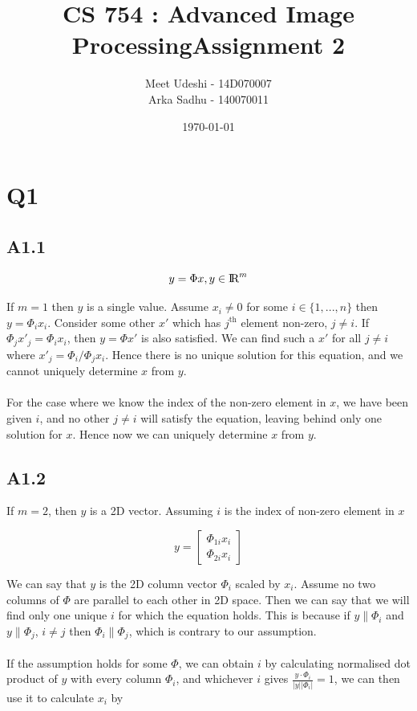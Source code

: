 \documentclass{article}
\title{CS 754 : Advanced Image ProcessingAssignment 2}
\author{Meet Udeshi - 14D070007\\
  Arka Sadhu - 140070011\\
}
\date{\today}
\begin{document}
\maketitle

\section*{Q1}
\subsection*{A1.1}

$$ y = \Phi x, y\in \text{I\!R}^{m}$$

If $m=1$ then $y$ is a single value. Assume $x_i\neq 0$ for some $i \in \{1,...,n\}$
then $y = \Phi_i x_i$.
Consider some other $x'$ which has $j^{\text{th}}$ element non-zero, $j\neq i$.
If $\Phi_j x'_j = \Phi_i x_i$, then $y=\Phi x'$ is also satisfied. We can find
such a $x'$ for all $j\neq i$ where $x'_j = \Phi_i/\Phi_j x_i$.
Hence there is no unique solution for this equation, and we cannot uniquely determine $x$ from
$y$.
\\
\\
For the case where we know the index of the non-zero element in $x$, we have been given
$i$, and no other $j\neq i$ will satisfy the equation, leaving behind only one solution for $x$. Hence now we can uniquely determine $x$ from $y$.

\subsection*{A1.2}

If $m=2$, then $y$ is a 2D vector. Assuming $i$ is the index of non-zero element in
$x$

$$ y = \left[ 
  \begin{array}{c}
    \Phi_{1i}x_i\\
    \Phi_{2i}x_i
  \end{array} 
\right] 
$$

We can say that $y$ is the 2D column vector $\Phi_i$ scaled by $x_i$. Assume no two columns
of $\Phi$ are parallel to each other in 2D space. Then we can say that we will find only
one unique $i$ for which the equation holds. This is because if $y \| \Phi_i$ and
$y \| \Phi_j$, $i\neq j$ then $\Phi_i \| \Phi_j$, which is contrary to our assumption.
\\
\\
If the assumption holds for some $\Phi$, we can obtain $i$ by calculating
normalised dot product of $y$ with every column $\Phi_i$, and whichever $i$ gives
$\frac{y\cdot\Phi_i}{|y||\Phi_i|} = 1$, we can then use it to calculate $x_i$ by
\end{document}

